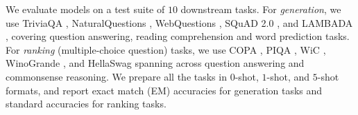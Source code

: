 We evaluate models on a test suite of $10$ downstream tasks.
For \textit{generation}, we use TriviaQA \cite{triviaqa}, NaturalQuestions \citep[NQ;][]{naturalquestions}, WebQuestions \citep[WQ;][]{webquestions}, SQuAD 2.0 \cite{squad2}, and LAMBADA \cite{lambada}, covering question answering, reading comprehension and word prediction tasks.
For \textit{ranking} (multiple-choice question) tasks, we use COPA \cite{copa}, PIQA \cite{piqa}, WiC \cite{wic}, WinoGrande \cite{winogrande}, and HellaSwag \cite{hellaswag} spanning across question answering and commonsense reasoning. We prepare all the tasks in $0$-shot, $1$-shot, and $5$-shot formats, and report exact match (EM) accuracies for generation tasks and standard accuracies for ranking tasks.



